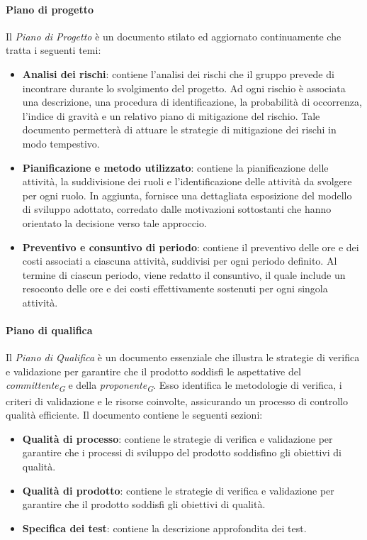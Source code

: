 \paragraph{Piano di progetto}
Il \textit{Piano di Progetto} è un documento stilato ed aggiornato continuamente che tratta i seguenti temi: 
\begin{itemize}
    \item \textbf{Analisi dei rischi}: contiene l'analisi dei rischi che il gruppo prevede di incontrare durante lo svolgimento del progetto. Ad ogni rischio è associata una descrizione, una procedura di identificazione, la probabilità di occorrenza, l'indice di gravità e un relativo piano di mitigazione del rischio. Tale documento permetterà di attuare le strategie di mitigazione dei rischi in modo tempestivo.
    \item \textbf{Pianificazione e metodo utilizzato}: contiene la pianificazione delle attività, la suddivisione dei ruoli e l'identificazione delle attività da svolgere per ogni ruolo. In aggiunta, fornisce una dettagliata esposizione del modello di sviluppo adottato, corredato dalle motivazioni sottostanti che hanno orientato la decisione verso tale approccio.
    \item \textbf{Preventivo e consuntivo di periodo}: contiene il preventivo  delle ore e dei costi associati a ciascuna attività, suddivisi per ogni periodo definito. Al termine di ciascun periodo, viene redatto il consuntivo, il quale include un resoconto delle ore e dei costi effettivamente sostenuti per ogni singola attività.
\end{itemize}

\paragraph{Piano di qualifica}
Il \textit{Piano di Qualifica} è un documento essenziale che illustra le strategie di verifica e validazione per garantire che il prodotto soddisfi le aspettative del \textit{committente}\textsubscript{\textit{G}} e della \textit{proponente}\textsubscript{\textit{G}}. Esso identifica le metodologie di verifica, i criteri di validazione e le risorse coinvolte, assicurando un processo di controllo qualità efficiente.  
Il documento contiene le seguenti sezioni:  
\begin{itemize}
    \item \textbf{Qualità di processo}: contiene le strategie di verifica e validazione per garantire che i processi di sviluppo del prodotto soddisfino gli obiettivi di qualità.
    \item \textbf{Qualità di prodotto}: contiene le strategie di verifica e validazione per garantire che il prodotto soddisfi gli obiettivi di qualità.
    \item \textbf{Specifica dei test}: contiene la descrizione approfondita dei test. 
\end{itemize}

